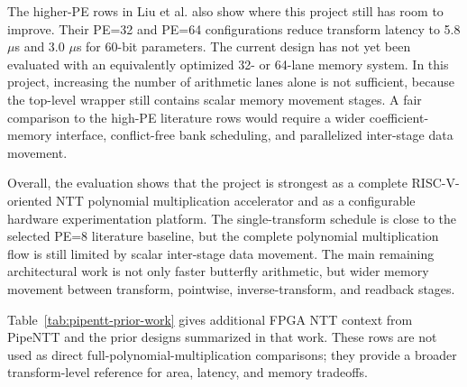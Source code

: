 \documentclass[a4paper, 12pt, titlepage]{article}
\begin{document}
The higher-PE rows in Liu et al. also show where this project still has room to
improve. Their PE=32 and PE=64 configurations reduce transform latency to
5.8 $\mu$s and 3.0 $\mu$s for 60-bit parameters. The current design has not yet
been evaluated with an equivalently optimized 32- or 64-lane memory system. In
this project, increasing the number of arithmetic lanes alone is not sufficient,
because the top-level wrapper still contains scalar memory movement stages. A
fair comparison to the high-PE literature rows would require a wider
coefficient-memory interface, conflict-free bank scheduling, and parallelized
inter-stage data movement.

Overall, the evaluation shows that the project is strongest as a complete
RISC-V-oriented NTT polynomial multiplication accelerator and as a configurable
hardware experimentation platform. The single-transform schedule is close to the
selected PE=8 literature baseline, but the complete polynomial multiplication
flow is still limited by scalar inter-stage data movement. The main
remaining architectural work is not only faster butterfly arithmetic, but wider
memory movement between transform, pointwise, inverse-transform, and readback
stages.

Table~\ref{tab:pipentt-prior-work} gives additional FPGA NTT context from PipeNTT and the prior designs summarized in that work. These rows are not used as direct full-polynomial-multiplication comparisons; they provide a broader transform-level reference for area, latency, and memory tradeoffs.
\end{document}
